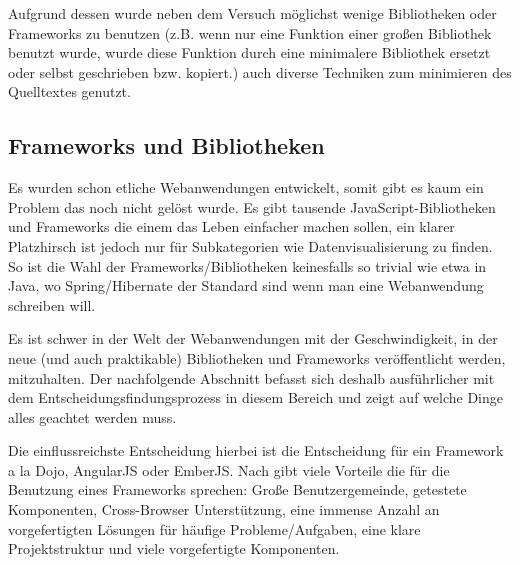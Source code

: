 \documentclass[12pt,twoside]{book}
\begin{document}
Aufgrund dessen wurde neben dem Versuch möglichst wenige Bibliotheken oder Frameworks zu benutzen (z.B. wenn nur eine Funktion einer großen Bibliothek benutzt wurde, wurde diese Funktion durch eine minimalere Bibliothek ersetzt oder selbst geschrieben bzw. kopiert.) auch diverse Techniken zum minimieren des Quelltextes genutzt.

\subsection{Frameworks und Bibliotheken}

Es wurden schon etliche Webanwendungen entwickelt, somit gibt es kaum ein Problem das noch nicht gelöst wurde. Es gibt tausende JavaScript-Bibliotheken und Frameworks die einem das Leben einfacher machen sollen, ein klarer Platzhirsch ist jedoch nur für Subkategorien wie Datenvisualisierung zu finden. So ist die Wahl der Frameworks/Bibliotheken keinesfalls so trivial wie etwa in Java, wo Spring/Hibernate der Standard sind wenn man eine Webanwendung schreiben will.

Es ist schwer in der Welt der Webanwendungen mit der Geschwindigkeit, in der neue (und auch praktikable) Bibliotheken und Frameworks veröffentlicht werden, mitzuhalten. Der nachfolgende Abschnitt befasst sich deshalb ausführlicher mit dem Entscheidungsfindungsprozess in diesem Bereich und zeigt auf welche Dinge alles geachtet werden muss.

Die einflussreichste Entscheidung hierbei ist die Entscheidung für ein Framework a la Dojo\cite{dojo}, AngularJS\cite{angularjs} oder EmberJS\cite{emberjs}.
Nach \cite{prosandcons} gibt viele Vorteile die für die Benutzung eines Frameworks sprechen: Große Benutzergemeinde, getestete Komponenten, Cross-Browser Unterstützung, eine immense Anzahl an vorgefertigten Lösungen für häufige Probleme/Aufgaben, eine klare Projektstruktur und viele vorgefertigte Komponenten.
\end{document}
